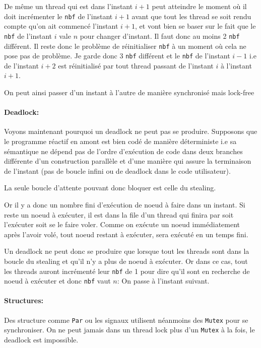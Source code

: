 \documentclass[a4paper]{article}
\renewcommand{\(}{\left(}
\renewcommand{\)}{\right)}
\begin{document}
De même un thread qui est dans l'instant $i+1$ peut atteindre le moment où il
doit incrémenter le \verb!nbf! de l'instant $i+1$ avant que tout les thread se
soit rendu compte qu'on ait commencé l'instant $i+1$, et vont bien se baser sur
le fait que le \verb!nbf! de l'instant $i$ vale $n$ pour changer d'instant. Il
faut donc au moins 2 \verb!nbf! différent. Il reste donc le problème de
réinitialiser \verb!nbf! à un moment où cela ne pose pas de problème. Je garde
donc 3 \verb!nbf! différent et le \verb!nbf! de l'instant $i-1$ i.e de l'instant
$i+2$ est réinitialisé par tout thread passant de l'instant $i$ à l'instant $i+1$.

On peut ainsi passer d'un instant à l'autre de manière synchronisé mais lock-free

\paragraph{Deadlock:} Voyons maintenant pourquoi un deadlock ne peut pas se
produire. Supposons que le programme réactif en amont est bien codé de manière
déterministe i.e sa sémantique ne dépend pas de l'ordre d'exécution de code dans
deux branches différente d'un construction parallèle et d'une manière qui assure
la terminaison de l'instant (pas de boucle infini ou de deadlock dans le code
utilisateur).

La seule boucle d'attente pouvant donc bloquer est celle du stealing.

Or il y a donc un nombre fini d'exécution de noeud à faire dans un instant.
Si reste un noeud à exécuter, il est dans la file d'un thread qui finira
par soit l'exécuter soit se le faire voler. Comme on exécute un noeud
immédiatement après l'avoir volé, tout noeud restant à exécuter, sera exécuté
en un temps fini.

Un deadlock ne peut donc se produire que lorsque tout les threads sont dans la
boucle du stealing et qu'il n'y a plus de noeud à exécuter. Or dans ce cas, tout
les threads auront incrémenté leur \verb!nbf! de 1 pour dire qu'il sont en
recherche de noeud à exécuter et donc \verb!nbf! vaut $n$: On passe à l'instant
suivant.

\paragraph{Structures:} Des structure comme \verb!Par! ou les signaux utilisent
néanmoins des \verb!Mutex! pour se synchroniser. On ne peut jamais dans un
thread lock plus d'un \verb!Mutex! à la fois, le deadlock est impossible.
\end{document}
